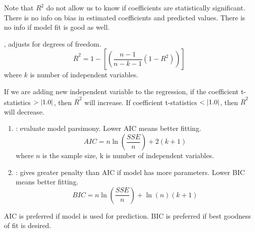 Note that $R^2$ do not allow us to know if coefficients are statistically significant. There is no info on bias in estimated coefficients and predicted values. There is no info if model fit is good as well.

\begin{definition} , adjusts for degrees of freedom.
\begin{equation}
\overline{R}^2 = 1 - \left[\left(\frac{n-1}{n-k-1} (1-R^2) \right) \right] \nonumber
\end{equation}
where $k$ is number of independent variables.
\end{definition}

If we are adding new independent variable to the regression, if the coefficient t-statistics $> \left\lvert1.0\right\rvert$, then $\overline{R}^2$ will increase. If coefficient t-statistics $< \left\lvert1.0\right\rvert$, then $\overline{R}^2$ will decrease.

\begin{definition} 
\begin{enumerate}[label=\roman*.]
\setlength{\itemsep}{0pt}
\item {}: evaluate model parsimony. Lower AIC means better fitting.
\begin{equation}
AIC = n \ln(\frac{SSE}{n}) + 2(k+1) \nonumber
\end{equation}
where $n$ is the sample size, k is number of independent variables.
\item {}: gives greater penalty than AIC if model has more parameters. Lower BIC means better fitting.
\begin{equation}
BIC = n \ln(\frac{SSE}{n}) + \ln(n)(k+1) \nonumber
\end{equation}
\end{enumerate}
\end{definition}

AIC is preferred if model is used for prediction. BIC is preferred if best goodness of fit is desired.
